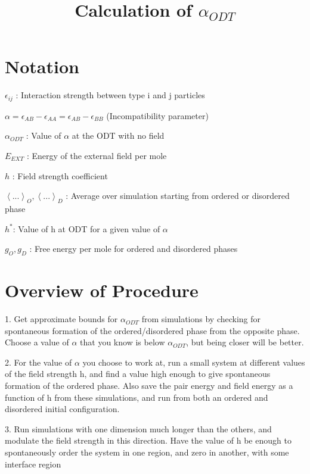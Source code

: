 \documentclass[11pt, oneside]{article}   	%
\begin{document}
\title{Calculation of $\alpha_{ODT}$}
\maketitle
\section{Notation}


       $\epsilon_{ij}$ :        Interaction strength between type i and j particles

\noindent $\alpha = \epsilon_{AB}-\epsilon_{AA} = \epsilon_{AB}-\epsilon_{BB}$ (Incompatibility parameter)

\noindent $\alpha_{ODT}$ :        Value of $\alpha$ at the ODT with no field

\noindent $E_{EXT}$ :       Energy of the external field per mole
 
 \noindent $h$ :         Field strength coefficient
 
 \noindent $\left<...\right>_{O}, \left<...\right>_{D}$ :    Average over simulation starting from ordered or disordered phase
 
 \noindent $h^*$:         Value of h at ODT for a given value of $\alpha$
 
 \noindent $g_O, g_D$ :        Free energy per mole for ordered and disordered phases
 
\section{Overview of Procedure}
1. Get approximate bounds for $\alpha_{ODT}$ from simulations by checking for spontaneous formation of the ordered/disordered phase from the opposite phase. Choose a value of $\alpha$ that you know is below $\alpha_{ODT}$, but being closer will be better.
\vspace{5mm}

2. For the value of $\alpha$ you choose to work at, run a small system at different values of the field strength h, and find a value high enough to give spontaneous formation of the ordered phase. Also save the pair energy and field energy as a function of h from these simulations, and run from both an ordered and disordered initial configuration.
\vspace{5mm}

3. Run simulations with one dimension much longer than the others, and modulate the field strength in this direction. Have the value of h be enough to spontaneously order the system in one region, and zero in another, with some interface region
\vspace{5mm}
\end{document}
